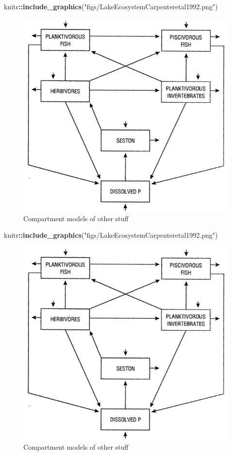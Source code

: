 \documentclass[
]{book}
\newenvironment{Shaded}{\begin{snugshade}}{\end{snugshade}}
\newcommand{\KeywordTok}[1]{\textcolor[rgb]{0.13,0.29,0.53}{\textbf{#1}}}
\newcommand{\NormalTok}[1]{#1}
\newcommand{\OperatorTok}[1]{\textcolor[rgb]{0.81,0.36,0.00}{\textbf{#1}}}
\newcommand{\StringTok}[1]{\textcolor[rgb]{0.31,0.60,0.02}{#1}}
\begin{document}
\begin{Shaded}
\begin{Highlighting}[]
\NormalTok{knitr}\OperatorTok{::}\KeywordTok{include_graphics}\NormalTok{(}\StringTok{"figs/LakeEcosystemCarpenteretal1992.png"}\NormalTok{)}
\end{Highlighting}
\end{Shaded}

\begin{figure}
\includegraphics[width=1\linewidth]{figs/LakeEcosystemCarpenteretal1992} \caption{Compartment models of other stuff}\label{fig:compartment2}
\end{figure}

\begin{Shaded}
\begin{Highlighting}[]
\NormalTok{knitr}\OperatorTok{::}\KeywordTok{include_graphics}\NormalTok{(}\StringTok{"figs/LakeEcosystemCarpenteretal1992.png"}\NormalTok{)}
\end{Highlighting}
\end{Shaded}

\begin{figure}
\includegraphics[width=0.5\linewidth]{figs/LakeEcosystemCarpenteretal1992} \caption{Compartment models of other stuff}\label{fig:compartment2b}
\end{figure}
\end{document}
